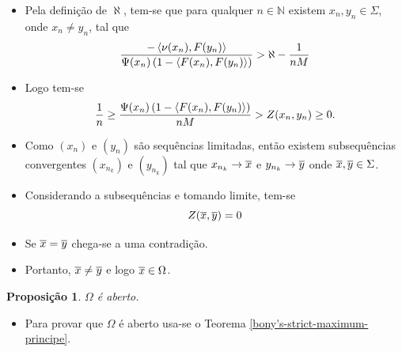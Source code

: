 \documentclass[12pt,a4paper]{beamer}
\newtheorem{proposicao}{Proposição}
\theoremstyle{definition}
\begin{document}
\begin{frame}
		
	\begin{itemize}
		\item Pela definição de $\aleph$, tem-se que para qualquer $n \in \mathbb{N}$ existem $x_n,y_n \in \Sigma$, onde $x_n \neq y_n$, tal que
		\begin{equation*}
			\frac{- \left\langle \nu(x_n),F(y_n) \right\rangle}{\Psi(x_n) \left( 1 - \left\langle F(x_n),F(y_n) \right\rangle \right)} > \aleph - \frac{1}{nM}
		\end{equation*}
		
		\pause
		
		\item Logo tem-se
		\begin{equation*}
			\frac{1}{n} \geq \frac{\Psi(x_n) \left( 1 - \left\langle F(x_n),F(y_n) \right\rangle \right)}{nM} > Z(x_n, y_n) \geq 0.
		\end{equation*}
		
		\pause
		
		\item Como $(x_n)$ e $(y_n)$ são sequências limitadas, então existem subsequências convergentes $(x_{n_k})$ e $(y_{n_k})$ tal que $x_{n_k} \rightarrow \overline{x}$ e $y_{n_k} \rightarrow \overline{y}$ onde $\overline{x},\overline{y} \in \Sigma$.
	\end{itemize}

\end{frame}

\begin{frame}
	\begin{itemize}
		\item Considerando a subsequências e tomando limite, tem-se
		\begin{equation*}
			Z(\overline{x},\overline{y}) = 0
		\end{equation*}
		
		\pause
		
		\item Se $\overline{x} = \overline{y}$ chega-se a uma contradição.
		
		\pause
		
		\item Portanto, $\overline{x} \neq \overline{y}$ e logo $\overline{x} \in \Omega$.
	\end{itemize}

	\pause

	\begin{proposicao}
		$\Omega$ é aberto.
	\end{proposicao}

	\pause

	\begin{itemize}
		\item Para provar que $\Omega$ é aberto usa-se o Teorema \ref{bony's-strict-maximum-principe}.
	\end{itemize}

\end{frame}
\end{document}
